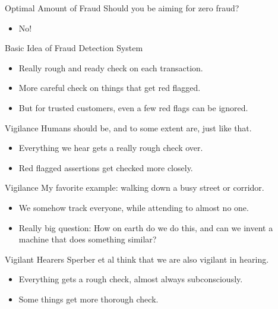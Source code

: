 \documentclass[
  17pt,
  letterpaper,
  ignorenonframetext,
  aspectratio=169,
  handout]{beamer}
\providecommand{\tightlist}{%
  \setlength{\itemsep}{0pt}\setlength{\parskip}{0pt}}\usepackage{longtable,booktabs,array}
\begin{document}
\begin{frame}{Optimal Amount of Fraud}
\protect\hypertarget{optimal-amount-of-fraud}{}
Should you be aiming for zero fraud?

\begin{itemize}[<+->]
\tightlist
\item
  No!
\end{itemize}
\end{frame}

\begin{frame}{Basic Idea of Fraud Detection System}
\protect\hypertarget{basic-idea-of-fraud-detection-system}{}
\begin{itemize}[<+->]
\tightlist
\item
  Really rough and ready check on each transaction.
\item
  More careful check on things that get red flagged.
\item
  But for trusted customers, even a few red flags can be ignored.
\end{itemize}
\end{frame}

\begin{frame}{Vigilance}
\protect\hypertarget{vigilance}{}
Humans should be, and to some extent are, just like that.

\begin{itemize}[<+->]
\tightlist
\item
  Everything we hear gets a really rough check over.
\item
  Red flagged assertions get checked more closely.
\end{itemize}
\end{frame}

\begin{frame}{Vigilance}
\protect\hypertarget{vigilance-1}{}
My favorite example: walking down a busy street or corridor.

\begin{itemize}[<+->]
\tightlist
\item
  We somehow track everyone, while attending to almost no one.
\item
  Really big question: How on earth do we do this, and can we invent a
  machine that does something similar?
\end{itemize}
\end{frame}

\begin{frame}{Vigilant Hearers}
\protect\hypertarget{vigilant-hearers}{}
Sperber et al think that we are also vigilant in hearing.

\begin{itemize}[<+->]
\tightlist
\item
  Everything gets a rough check, almost always subconsciously.
\item
  Some things get more thorough check.
\end{itemize}
\end{frame}
\end{document}
